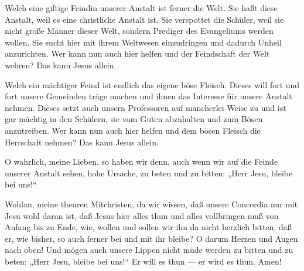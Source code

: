 Welch eine giftige Feindin unserer Anstalt ist ferner die Welt. Sie haßt diese Anstalt, weil es eine christliche Anstalt ist. Sie verspottet die Schüler, weil sie nicht große Männer dieser Welt, sondern Prediger des Evangeliums werden wollen. Sie sucht hier mit ihrem Weltwesen einzudringen und dadurch Unheil anzurichten. Wer kann nun auch hier helfen und der Feindschaft der Welt wehren? Das kann Jesus allein.

Welch ein mächtiger Feind ist endlich das eigene böse Fleisch. Dieses will fort und fort unsere Gemeinden träge machen und ihnen das Interesse für unsere Anstalt nehmen. Dieses setzt auch unsern Professoren auf mancherlei Weise zu und ist gar mächtig in den Schülern, sie vom Guten abzuhalten und zum Bösen anzutreiben. Wer kann nun auch hier helfen und dem bösen Fleisch die Herrschaft nehmen? Das kann Jesus allein.

O wahrlich, meine Lieben, so haben wir denn, auch wenn wir auf die Feinde unserer Anstalt sehen, hohe Ursache, zu beten und zu bitten: „Herr Jesu, bleibe bei uns!“

Wohlan, meine theuren Mitchristen, da wir wissen, daß unsere Concordia nur mit Jesu wohl daran ist, daß Jesus hier alles thun und alles vollbringen muß von Anfang bis zu Ende, wie, wollen und sollen wir ihn da nicht herzlich bitten, daß er, wie bisher, so auch ferner bei und mit ihr bleibe? O darum Herzen und Augen nach oben! Und mögen auch unsere Lippen nicht müde werden zu bitten und zu beten: „Herr Jesu, bleibe bei uns!“ Er will es thun — er wird es thun. Amen!
